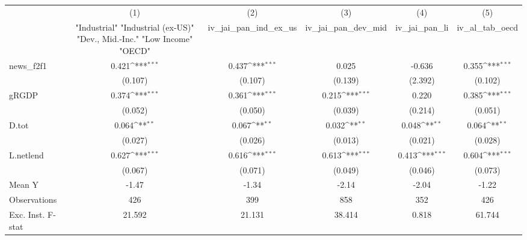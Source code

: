 {
\def\sym#1{\ifmmode^{#1}\else\(^{#1}\)\fi}
\begin{tabular}{l*{5}{c}}
\toprule
            &\multicolumn{1}{c}{(1)}&\multicolumn{1}{c}{(2)}&\multicolumn{1}{c}{(3)}&\multicolumn{1}{c}{(4)}&\multicolumn{1}{c}{(5)}\\
            &\multicolumn{1}{c}{ "Industrial" "Industrial (ex-US)" "Dev., Mid.-Inc." "Low Income" "OECD" }&\multicolumn{1}{c}{iv\_jai\_pan\_ind\_ex\_us}&\multicolumn{1}{c}{iv\_jai\_pan\_dev\_mid}&\multicolumn{1}{c}{iv\_jai\_pan\_li}&\multicolumn{1}{c}{iv\_al\_tab\_oecd}\\
\midrule
news\_f2f1   &       0.421\sym{***}&       0.437\sym{***}&       0.025         &      -0.636         &       0.355\sym{***}\\
            &     (0.107)         &     (0.107)         &     (0.139)         &     (2.392)         &     (0.102)         \\
\addlinespace
gRGDP       &       0.374\sym{***}&       0.361\sym{***}&       0.215\sym{***}&       0.220         &       0.385\sym{***}\\
            &     (0.052)         &     (0.050)         &     (0.039)         &     (0.214)         &     (0.051)         \\
\addlinespace
D.tot       &       0.064\sym{**} &       0.067\sym{**} &       0.032\sym{**} &       0.048\sym{**} &       0.064\sym{**} \\
            &     (0.027)         &     (0.026)         &     (0.013)         &     (0.021)         &     (0.028)         \\
\addlinespace
L.netlend   &       0.627\sym{***}&       0.616\sym{***}&       0.613\sym{***}&       0.413\sym{***}&       0.604\sym{***}\\
            &     (0.067)         &     (0.071)         &     (0.049)         &     (0.046)         &     (0.073)         \\
\midrule
Mean Y      &       -1.47         &       -1.34         &       -2.14         &       -2.04         &       -1.22         \\
Observations&         426         &         399         &         858         &         352         &         426         \\
Exc. Inst. F-stat&      21.592         &      21.131         &      38.414         &       0.818         &      61.744         \\
\bottomrule
\end{tabular}
}
